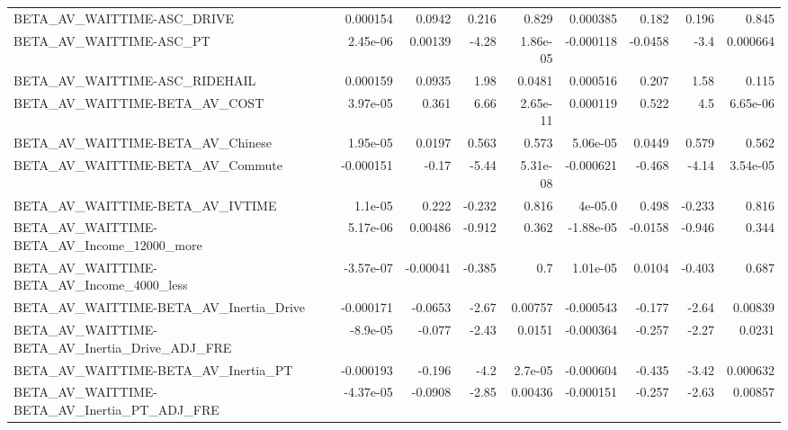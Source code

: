 \begin{tabular}{lrrrrrrrr}
BETA\_AV\_WAITTIME-ASC\_DRIVE                         &    0.000154 &       0.0942 &    0.216 &    0.829 &   0.000385 &       0.182 &        0.196 &         0.845 \\
BETA\_AV\_WAITTIME-ASC\_PT                            &    2.45e-06 &      0.00139 &    -4.28 & 1.86e-05 &  -0.000118 &     -0.0458 &         -3.4 &      0.000664 \\
BETA\_AV\_WAITTIME-ASC\_RIDEHAIL                      &    0.000159 &       0.0935 &     1.98 &   0.0481 &   0.000516 &       0.207 &         1.58 &         0.115 \\
BETA\_AV\_WAITTIME-BETA\_AV\_COST                      &    3.97e-05 &        0.361 &     6.66 & 2.65e-11 &   0.000119 &       0.522 &          4.5 &      6.65e-06 \\
BETA\_AV\_WAITTIME-BETA\_AV\_Chinese                   &    1.95e-05 &       0.0197 &    0.563 &    0.573 &   5.06e-05 &      0.0449 &        0.579 &         0.562 \\
BETA\_AV\_WAITTIME-BETA\_AV\_Commute                   &   -0.000151 &        -0.17 &    -5.44 & 5.31e-08 &  -0.000621 &      -0.468 &        -4.14 &      3.54e-05 \\
BETA\_AV\_WAITTIME-BETA\_AV\_IVTIME                    &     1.1e-05 &        0.222 &   -0.232 &    0.816 &    4e-05.0 &       0.498 &       -0.233 &         0.816 \\
BETA\_AV\_WAITTIME-BETA\_AV\_Income\_12000\_more         &    5.17e-06 &      0.00486 &   -0.912 &    0.362 &  -1.88e-05 &     -0.0158 &       -0.946 &         0.344 \\
BETA\_AV\_WAITTIME-BETA\_AV\_Income\_4000\_less          &   -3.57e-07 &     -0.00041 &   -0.385 &      0.7 &   1.01e-05 &      0.0104 &       -0.403 &         0.687 \\
BETA\_AV\_WAITTIME-BETA\_AV\_Inertia\_Drive             &   -0.000171 &      -0.0653 &    -2.67 &  0.00757 &  -0.000543 &      -0.177 &        -2.64 &       0.00839 \\
BETA\_AV\_WAITTIME-BETA\_AV\_Inertia\_Drive\_ADJ\_FRE     &    -8.9e-05 &       -0.077 &    -2.43 &   0.0151 &  -0.000364 &      -0.257 &        -2.27 &        0.0231 \\
BETA\_AV\_WAITTIME-BETA\_AV\_Inertia\_PT                &   -0.000193 &       -0.196 &     -4.2 &  2.7e-05 &  -0.000604 &      -0.435 &        -3.42 &      0.000632 \\
BETA\_AV\_WAITTIME-BETA\_AV\_Inertia\_PT\_ADJ\_FRE        &   -4.37e-05 &      -0.0908 &    -2.85 &  0.00436 &  -0.000151 &      -0.257 &        -2.63 &       0.00857 \\

\end{tabular}
